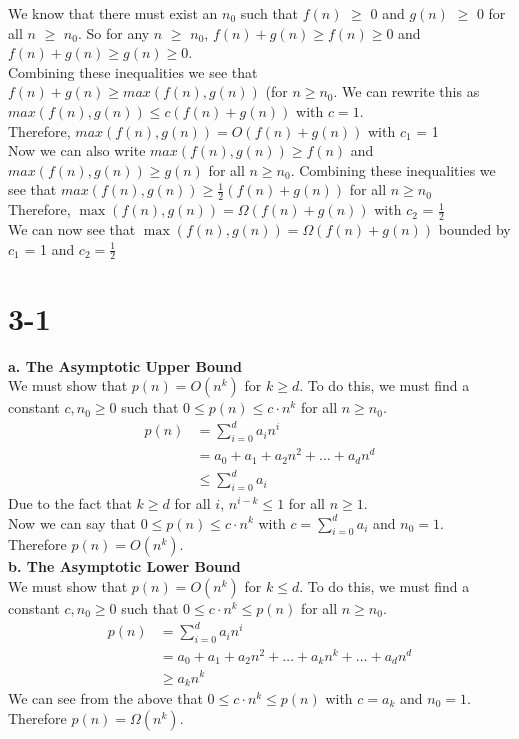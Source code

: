 \documentclass{article}
\begin{document}
{\noindent
We know that there must exist an $n_{0}$ such that $f(n)$ $\geq$ 0 and $g(n)$ $\geq$ 0 for all
$n$ $\geq$ $n_{0}$. So for any $n$ $\geq$ $n_{0}$, $f(n) + g(n) \geq f(n) \geq 0$ and $f(n) +
g(n) \geq g(n) \geq 0$. \\
Combining these inequalities we see that $f(n) + g(n) \geq max(f(n),g(n))$ (for $n \geq n_{0}$.
We can rewrite this as $max(f(n),g(n)) \leq c(f(n) + g(n))$ with $c = 1$. \\
Therefore, $max(f(n),g(n)) = O(f(n) + g(n))$ with $c_{1}$ = 1\\

\noindent
Now we can also write $max(f(n),g(n)) \geq f(n)$ and $max(f(n),g(n)) \geq g(n)$
for all $n \geq n_{0}$. Combining these inequalities we see that
$max(f(n),g(n)) \geq \frac{1}{2}(f(n) + g(n))$ for all $n \geq n_{0}$ \\

\noindent
Therefore, $\max(f(n),g(n)) = \Omega(f(n) + g(n))$ with $c_{2}$ = $\frac{1}{2}$ \\

\noindent
We can now see that $\max(f(n),g(n)) = \Omega(f(n) + g(n))$ bounded by $c_{1}$ = 1 and $c_{2} = \frac{1}{2}$


\section{3-1}
\textbf{a. The Asymptotic Upper Bound} \\
We must show that $p(n) = O(n^k)$ for $k \geq d$. To do this, we must find a constant $c, n_{0} \geq 0$
such that $0 \leq p(n) \leq c \cdot n^k$ for all $n \geq n_{0}$. \\
\begin{align*}
  p(n) &= \sum_{i=0}^{d} a_{i}n^i \\
       &= a_{0} + a_{1} + a_2n^2 + \dots + a_dn^d \\
       &\leq \sum_{i=0}^{d} a_i
\end{align*}
Due to the fact that $k \geq d$ for all $i$, $n^{i-k} \leq 1$ for all $n \geq 1$. \\
Now we can say that $0 \leq p(n) \leq c \cdot n^k$ with $c = \sum_{i=0}^{d} a_i$ and $n_0 = 1$. \\
Therefore $p(n) = O(n^k)$.
\\

\noindent
\textbf{b. The Asymptotic Lower Bound} \\
We must show that $p(n) = O(n^k)$ for $k \leq d$. To do this, we must find a constant $c, n_{0} \geq 0$
such that $0 \leq c \cdot n^k \leq p(n)$ for all $n \geq n_{0}$. \\
\begin{align*}
  p(n) &= \sum_{i=0}^{d} a_{i}n^i \\
       &= a_{0} + a_{1} + a_2n^2 + \dots + a_kn^k + \dots + a_dn^d \\
       &\geq a_kn^k
\end{align*}
We can see from the above that $0 \leq c \cdot n^k \leq p(n)$ with $c = a_k$ and $n_0 = 1$. \\
Therefore $p(n) = \Omega(n^k)$. \\

}
\end{document}
